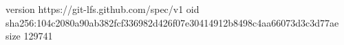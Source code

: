version https://git-lfs.github.com/spec/v1
oid sha256:104c2080a90ab382fcf336982d426f07e30414912b8498c4aa66073d3c3d77ae
size 129741
